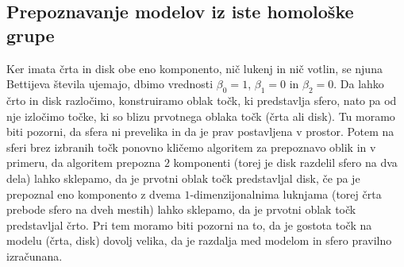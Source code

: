 \documentclass[a4paper,11pt]{article}
\begin{document}
\subsection{Prepoznavanje modelov iz iste homološke grupe}

Ker imata črta in disk obe eno komponento, nič lukenj in nič votlin, se njuna Bettijeva števila ujemajo, dbimo vrednosti $\beta_0=1$, $\beta_1=0$ in $\beta_2=0$. Da lahko črto in disk razločimo, konstruiramo oblak točk, ki predstavlja sfero, nato pa od nje izločimo točke, ki so blizu prvotnega oblaka točk (črta ali disk). Tu moramo biti pozorni, da sfera ni prevelika in da je prav postavljena v prostor. Potem na sferi brez izbranih točk ponovno kličemo algoritem za prepoznavo oblik in v primeru, da algoritem prepozna $2$ komponenti (torej je disk razdelil sfero na dva dela) lahko sklepamo, da je prvotni oblak točk predstavljal disk, če pa je prepoznal eno komponento z dvema $1$-dimenzijonalnima luknjama (torej črta prebode sfero na dveh mestih) lahko sklepamo, da je prvotni oblak točk predstavljal črto. Pri tem moramo biti pozorni na to, da je gostota točk na modelu (črta, disk) dovolj velika, da je razdalja med modelom in sfero pravilno izračunana.
\end{document}
